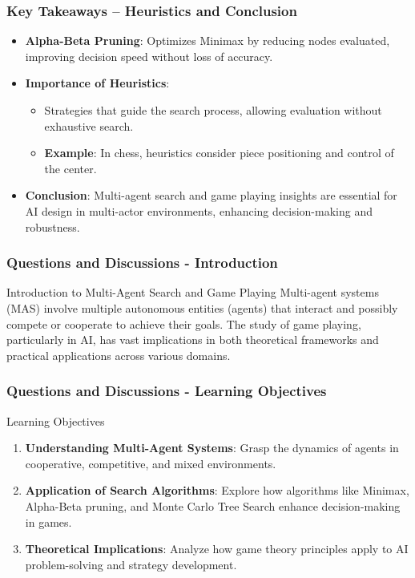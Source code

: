 \documentclass[aspectratio=169]{beamer}
\begin{document}
\begin{frame}[fragile]
    \frametitle{Key Takeaways – Heuristics and Conclusion}
    \begin{itemize}
        \item \textbf{Alpha-Beta Pruning}: Optimizes Minimax by reducing nodes evaluated, improving decision speed without loss of accuracy.
        \item \textbf{Importance of Heuristics}:
        \begin{itemize}
            \item Strategies that guide the search process, allowing evaluation without exhaustive search.
            \item \textbf{Example}: In chess, heuristics consider piece positioning and control of the center.
        \end{itemize}
        \item \textbf{Conclusion}: Multi-agent search and game playing insights are essential for AI design in multi-actor environments, enhancing decision-making and robustness.
    \end{itemize}
\end{frame}

\begin{frame}[fragile]
    \frametitle{Questions and Discussions - Introduction}
    \begin{block}{Introduction to Multi-Agent Search and Game Playing}
        Multi-agent systems (MAS) involve multiple autonomous entities (agents) that interact and possibly compete or cooperate to achieve their goals. The study of game playing, particularly in AI, has vast implications in both theoretical frameworks and practical applications across various domains.
    \end{block}
\end{frame}

\begin{frame}[fragile]
    \frametitle{Questions and Discussions - Learning Objectives}
    \begin{block}{Learning Objectives}
        \begin{enumerate}
            \item \textbf{Understanding Multi-Agent Systems}: Grasp the dynamics of agents in cooperative, competitive, and mixed environments.
            \item \textbf{Application of Search Algorithms}: Explore how algorithms like Minimax, Alpha-Beta pruning, and Monte Carlo Tree Search enhance decision-making in games.
            \item \textbf{Theoretical Implications}: Analyze how game theory principles apply to AI problem-solving and strategy development.
        \end{enumerate}
    \end{block}
\end{frame}
\end{document}
